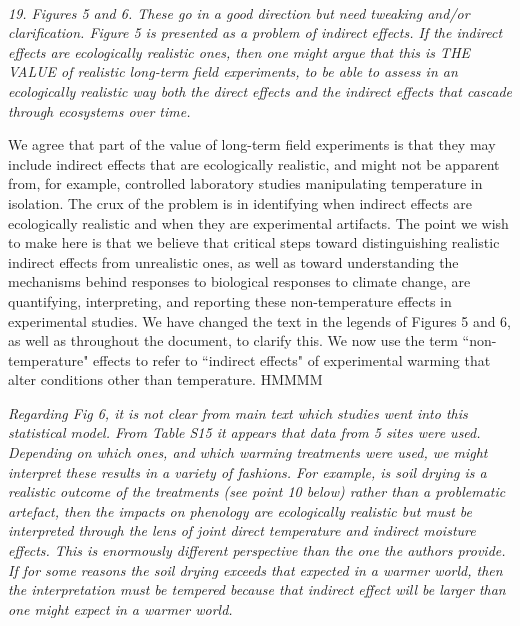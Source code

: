 \documentclass[11pt,a4paper]{letter}
\begin{document}
\begin{letter}{}
\\
\par \emph{19. Figures 5 and 6. These go in a good direction but need tweaking and/or clarification. Figure 5 is presented as a
problem of indirect effects. If the indirect effects are ecologically realistic ones, then one might
argue that this is THE VALUE of realistic long-term field experiments, to be able to assess in an
ecologically realistic way both the direct effects and the indirect effects that cascade through
ecosystems over time.}

We agree that part of the value of long-term field experiments is that they may include indirect effects that are ecologically realistic, and might not be apparent from, for example, controlled laboratory studies manipulating temperature in isolation. The crux of the problem is in identifying when indirect effects are ecologically realistic and when they are experimental artifacts. The point we wish to make here is that we believe that critical steps toward distinguishing realistic indirect effects from unrealistic ones, as well as toward understanding the mechanisms behind responses to biological responses to climate change, are quantifying, interpreting, and reporting these non-temperature effects in experimental studies. We have changed the text in the legends of Figures 5 and 6, as well as throughout the document, to clarify this. We now use the term ``non-temperature" effects to refer to ``indirect effects" of experimental warming that alter conditions other than temperature. HMMMM
\\
\par \emph{Regarding Fig 6, it is not clear from main text which studies went into this statistical model. From Table S15 it appears that data from 5 sites were used. Depending on which ones, and which warming treatments were used, we might interpret these results in a variety of fashions. For example, is soil drying is a realistic outcome of the treatments (see point 10 below) rather than a problematic artefact, then the impacts on phenology are ecologically realistic but must be interpreted through the lens of joint direct temperature and indirect moisture effects. This is enormously different perspective than the one the authors provide. If for some reasons the soil drying exceeds that expected in a warmer world, then the interpretation must be tempered because that indirect effect will be larger than one might expect in a warmer world.}


\end{letter}
\end{document}
